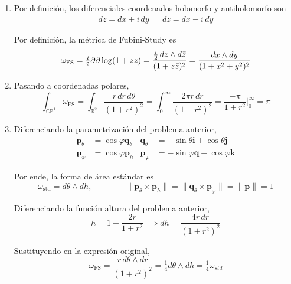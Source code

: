 \begin{solution}
\leavevmode
\begin{enumerate}
    \item Por definición, los diferenciales coordenados holomorfo y antiholomorfo son
    \begin{align*}
        dz = dx + i \, dy && d\bar z = dx - i \, dy
    \end{align*}
    
    Por definición, la métrica de Fubini-Study es
    $$\omega_\mathrm{FS} = \tfrac i2 \partial \bar \partial \log (1 + z \bar z) = \frac {\tfrac i2 \, dz \wedge d\bar z} {(1 + z \bar z)^2} = \frac {dx \wedge dy} {(1 + x^2 + y^2)^2}$$
    
    \item Pasando a coordenadas polares,
    $$\int_{\mathbb {CP}^1} \omega_\mathrm{FS} = \int_{\mathbb R^2} \frac {r \, dr \, d\theta} {(1 + r^2)^2} = \int_0^\infty \frac {2 \pi r \, dr} {(1 + r^2)^2} = \frac {-\pi} {1 + r^2} \Bigg|_0^\infty = \pi$$
    
    \item Diferenciando la parametrización del problema anterior,
    \begin{align*}
        \mathbf p_\theta  & = \cos \varphi \mathbf q_\theta & \mathbf q_\theta  & = -\sin \theta  \mathbf i + \cos \theta  \mathbf j \\
        \mathbf p_\varphi & = \cos \varphi \mathbf p_h      & \mathbf p_\varphi & = -\sin \varphi \mathbf q + \cos \varphi \mathbf k
    \end{align*}
    
    Por ende, la forma de área estándar es
    $$\omega_\mathrm{std} = d\theta \wedge dh, \qquad \qquad \| \mathbf p_\theta \times \mathbf p_h \| = \| \mathbf q_\theta \times \mathbf p_\varphi \| = \| \mathbf p \| = 1$$
    
    Diferenciando la función altura del problema anterior,
    $$h = 1 - \frac {2r} {1 + r^2} \implies dh = \frac {4r \, dr} {(1 + r^2)^2}$$
    
    Sustituyendo en la expresión original,
    $$\omega_\mathrm{FS} = \frac {r \, d\theta \wedge dr } {(1 + r^2)^2} = \tfrac 14 d\theta \wedge dh = \tfrac 14 \omega_{std}$$
\end{enumerate}
\end{solution}
